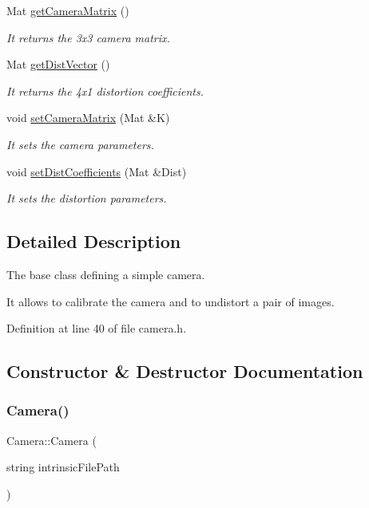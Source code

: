 \begin{DoxyCompactItemize}
Mat \mbox{\hyperlink{classCamera_af1433656f08f22aa1080d0c6e7a98df6}{get\+Camera\+Matrix}} ()
\begin{DoxyCompactList}\small\item\em It returns the 3x3 camera matrix. \end{DoxyCompactList}\item 
Mat \mbox{\hyperlink{classCamera_a1cd15bc4fd4f0405c7e047af632b9353}{get\+Dist\+Vector}} ()
\begin{DoxyCompactList}\small\item\em It returns the 4x1 distortion coefficients. \end{DoxyCompactList}\item 
void \mbox{\hyperlink{classCamera_ab1d197f991bc02d373d8833f7da2e7eb}{set\+Camera\+Matrix}} (Mat \&K)
\begin{DoxyCompactList}\small\item\em It sets the camera parameters. \end{DoxyCompactList}\item 
void \mbox{\hyperlink{classCamera_a018fb29ce30458045b22eeee47f61057}{set\+Dist\+Coefficients}} (Mat \&Dist)
\begin{DoxyCompactList}\small\item\em It sets the distortion parameters. \end{DoxyCompactList}\end{DoxyCompactItemize}


\subsection{Detailed Description}
The base class defining a simple camera. 

It allows to calibrate the camera and to undistort a pair of images. 

Definition at line 40 of file camera.\+h.



\subsection{Constructor \& Destructor Documentation}
\mbox{\label{classCamera_a4a02314716bac5282edd6aee6457f133}} 
\subsubsection{\texorpdfstring{Camera()}{Camera()}\hspace{0.1cm}{\footnotesize\ttfamily [1/2]}}
{\footnotesize\ttfamily Camera\+::\+Camera (\begin{DoxyParamCaption}\item[{string}]{intrinsic\+File\+Path }\end{DoxyParamCaption})}



